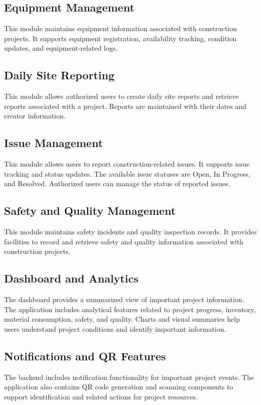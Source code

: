 \documentclass[11pt,a4paper]{article}
\begin{document}
\subsection{Equipment Management}
This module maintains equipment information associated with construction projects. It supports equipment registration, availability tracking, condition updates, and equipment-related logs.

\subsection{Daily Site Reporting}
This module allows authorized users to create daily site reports and retrieve reports associated with a project. Reports are maintained with their dates and creator information.

\subsection{Issue Management}
This module allows users to report construction-related issues. It supports issue tracking and status updates. The available issue statuses are Open, In Progress, and Resolved. Authorized users can manage the status of reported issues.

\subsection{Safety and Quality Management}
This module maintains safety incidents and quality inspection records. It provides facilities to record and retrieve safety and quality information associated with construction projects.

\subsection{Dashboard and Analytics}
The dashboard provides a summarized view of important project information. The application includes analytical features related to project progress, inventory, material consumption, safety, and quality. Charts and visual summaries help users understand project conditions and identify important information.

\subsection{Notifications and QR Features}
The backend includes notification functionality for important project events. The application also contains QR code generation and scanning components to support identification and related actions for project resources.
\end{document}
